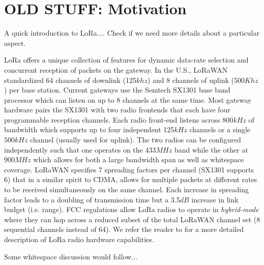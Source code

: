 \section{OLD STUFF: Motivation}
\label{sec:net-scale}

{\color{blue} A quick introduction to LoRa.... Check if we need more details about a particular aspect.}

LoRa offers a unique collection of features for dynamic data-rate selection and concurrent reception of packets on the gateway. In the U.S., LoRaWAN standardized 64 channels of downlink (125$khz$) and 8 channels of uplink (500$Khz$) per base station. Current gateways use the Semtech SX1301 base band processor which can listen on up to 8 channels at the same time. Most gateway hardware pairs the SX1301 with two radio frontends that each have four programmable reception channels. Each radio front-end listens across 800$kHz$ of bandwidth which supports up to four independent 125$kHz$ channels or a single 500$kHz$ channel (usually used for uplink).  The two radios can be configured independently such that one operates on the 433$MHz$ band while the other at 900$MHz$ which allows for both a large bandwidth span as well as whitespace coverage.  LoRaWAN specifies 7 spreading factors per channel (SX1301 supports 6) that in a similar spirit to CDMA, allows for multiple packets at different rates to be received simultaneously on the same channel.  Each increase in spreading factor leads to a doubling of transmission time but a 3.5$dB$ increase in link budget (i.e. range).  FCC regulations allow LoRa radios to operate in {\em hybrid-mode} where they can hop across a reduced subset of the total LoRaWAN channel set (8 sequential channels instead of 64). We refer the reader to \cite{sx1301} for a more detailed description of LoRa radio hardware capabilities.

{\color{blue} Some whitespace discussion would follow...}


